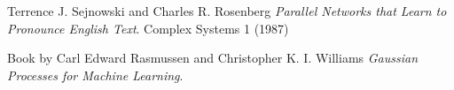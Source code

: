 \documentclass[paper=a4, fontsize=11pt]{scrartcl} %
\numberwithin{equation}{section} %
\numberwithin{figure}{section} %
\numberwithin{table}{section} %
\begin{document}
\begin{thebibliography}{9}
Terrence J. Sejnowski and Charles R. Rosenberg
\textit{Parallel Networks that Learn to Pronounce English Text}. 
Complex Systems 1 (1987)

Book by Carl Edward Rasmussen and Christopher K. I. Williams\textit{ Gaussian Processes for Machine Learning}. 



\end{thebibliography}
\end{document}
